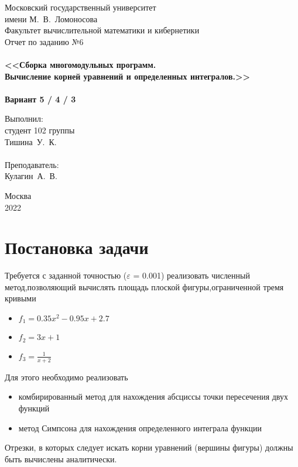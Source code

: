 \documentclass[a4paper,12pt,titlepage,finall]{article}
\begin{document}
\begin{titlepage}
    \begin{center}
	{\small \sc Московский государственный университет \\имени М.~В.~Ломоносова\\
	Факультет вычислительной математики и кибернетики\\}
	\vfill
	{\Large \sc Отчет по заданию №6}\\
	~\\
	{\large \bf <<Сборка многомодульных программ. \\
	Вычисление корней уравнений и определенных интегралов.>>}\\ 
	~\\
	{\large \bf Вариант 5 / 4 / 3}
    \end{center}
    \begin{flushright}
	\vfill {Выполнил:\\
	студент 102 группы\\
	Тишина~У.~К.\\
	~\\
	Преподаватель:\\
	Кулагин~А.~В.}
    \end{flushright}
    \begin{center}
	\vfill
	{\small Москва\\2022}
    \end{center}
\end{titlepage}

\tableofcontents
\newpage

\section{Постановка задачи}

Требуется с заданной точностью ($\varepsilon$ = 0.001) реализовать численный метод,позволяющий вычислять площадь плоской фигуры,ограниченной тремя кривыми
\begin{itemize}
\item {$f_1 = 0.35x^2-0.95x+2.7$} 
\item {$f_2 = 3x+1$} 
\item {$f_3 = \frac{1}{x+2}$}
\end{itemize}
Для этого необходимо реализовать
\begin{itemize}
\item комбирированный метод для нахождения абсциссы точки пересечения двух функций
\item метод Симпсона для нахождения определенного интеграла функции
\end{itemize}
Отрезки, в которых следует искать корни уравнений (вершины фигуры) должны быть вычислены аналитически.
\end{document}
